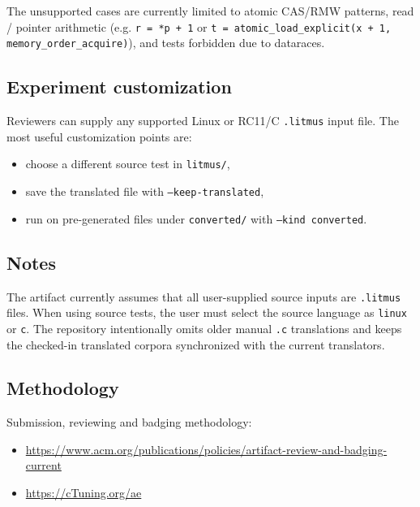 \documentclass{sigplanconf}
\begin{document}
The unsupported cases are currently limited to atomic CAS/RMW patterns, read / pointer arithmetic (e.g. \texttt{r = *p + 1} or \texttt{t = atomic\_load\_explicit(x + 1, memory\_order\_acquire)}), and tests forbidden due to dataraces.

\subsection{Experiment customization}

Reviewers can supply any supported Linux or RC11/C \texttt{.litmus} input file.
The most useful customization points are:

\begin{itemize}
  \item choose a different source test in \texttt{litmus/},
  \item save the translated file with \texttt{--keep-translated},
  \item run on pre-generated files under \texttt{converted/} with
        \texttt{--kind converted}.
\end{itemize}

\subsection{Notes}

The artifact currently assumes that all user-supplied source inputs are
\texttt{.litmus} files.  When using source tests, the user must select the
source language as \texttt{linux} or \texttt{c}.  The repository intentionally
omits older manual \texttt{.c} translations and keeps the checked-in translated
corpora synchronized with the current translators.

\subsection{Methodology}

Submission, reviewing and badging methodology:

\begin{itemize}
  \item \url{https://www.acm.org/publications/policies/artifact-review-and-badging-current}
  \item \url{https://cTuning.org/ae}
\end{itemize}

\end{document}
